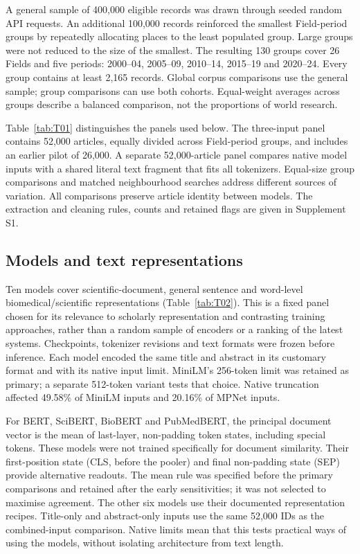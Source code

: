 \documentclass[12pt]{article}
\begin{document}
A general sample of 400,000 eligible records was drawn through seeded random API requests. An additional 100,000 records reinforced the smallest Field-period groups by repeatedly allocating places to the least populated group. Large groups were not reduced to the size of the smallest. The resulting 130 groups cover 26 Fields and five periods: 2000--04, 2005--09, 2010--14, 2015--19 and 2020--24. Every group contains at least 2,165 records. Global corpus comparisons use the general sample; group comparisons can use both cohorts. Equal-weight averages across groups describe a balanced comparison, not the proportions of world research.

Table~\ref{tab:T01} distinguishes the panels used below. The three-input panel contains 52,000 articles, equally divided across Field-period groups, and includes an earlier pilot of 26,000. A separate 52,000-article panel compares native model inputs with a shared literal text fragment that fits all tokenizers. Equal-size group comparisons and matched neighbourhood searches address different sources of variation. All comparisons preserve article identity between models. The extraction and cleaning rules, counts and retained flags are given in Supplement S1.


\subsection{Models and text representations}
Ten models cover scientific-document, general sentence and word-level biomedical/scientific representations (Table~\ref{tab:T02}). This is a fixed panel chosen for its relevance to scholarly representation and contrasting training approaches, rather than a random sample of encoders or a ranking of the latest systems. Checkpoints, tokenizer revisions and text formats were frozen before inference. Each model encoded the same title and abstract in its customary format and with its native input limit. MiniLM's 256-token limit was retained as primary; a separate 512-token variant tests that choice. Native truncation affected 49.58\% of MiniLM inputs and 20.16\% of MPNet inputs.

For BERT, SciBERT, BioBERT and PubMedBERT, the principal document vector is the mean of last-layer, non-padding token states, including special tokens. These models were not trained specifically for document similarity. Their first-position state (CLS, before the pooler) and final non-padding state (SEP) provide alternative readouts. The mean rule was specified before the primary comparisons and retained after the early sensitivities; it was not selected to maximise agreement. The other six models use their documented representation recipes. Title-only and abstract-only inputs use the same 52,000 IDs as the combined-input comparison. Native limits mean that this tests practical ways of using the models, without isolating architecture from text length.

\end{document}
